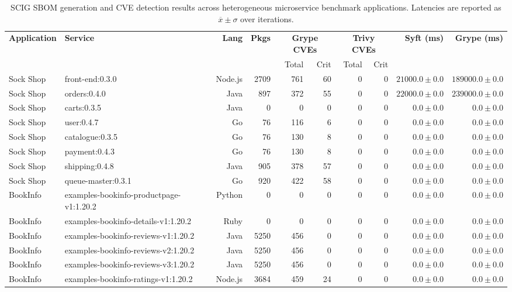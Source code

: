 \begin{table}[htbp]
\centering
\caption{SCIG SBOM generation and CVE detection results across heterogeneous microservice benchmark applications. Latencies are reported as $\overline{x} \pm \sigma$ over iterations.}
\label{tab:scig_s1_per_image}
\scriptsize
\begin{tabular}{llrrrrrrrr}
\toprule
\textbf{Application} & \textbf{Service} & \textbf{Lang} & \textbf{Pkgs} & \multicolumn{2}{c}{\textbf{Grype CVEs}} & \multicolumn{2}{c}{\textbf{Trivy CVEs}} & \textbf{Syft (ms)} & \textbf{Grype (ms)} \\
\cmidrule(lr){5-6} \cmidrule(lr){7-8}
 & & & & Total & Crit & Total & Crit & & \\
\midrule
Sock Shop & front-end:0.3.0 & Node.js & 2709 & 761 & 60 & 0 & 0 & $21000.0 \pm 0.0$ & $189000.0 \pm 0.0$ \\
Sock Shop & orders:0.4.0 & Java & 897 & 372 & 55 & 0 & 0 & $22000.0 \pm 0.0$ & $239000.0 \pm 0.0$ \\
Sock Shop & carts:0.3.5 & Java & 0 & 0 & 0 & 0 & 0 & $0.0 \pm 0.0$ & $0.0 \pm 0.0$ \\
Sock Shop & user:0.4.7 & Go & 76 & 116 & 6 & 0 & 0 & $0.0 \pm 0.0$ & $0.0 \pm 0.0$ \\
Sock Shop & catalogue:0.3.5 & Go & 76 & 130 & 8 & 0 & 0 & $0.0 \pm 0.0$ & $0.0 \pm 0.0$ \\
Sock Shop & payment:0.4.3 & Go & 76 & 130 & 8 & 0 & 0 & $0.0 \pm 0.0$ & $0.0 \pm 0.0$ \\
Sock Shop & shipping:0.4.8 & Java & 905 & 378 & 57 & 0 & 0 & $0.0 \pm 0.0$ & $0.0 \pm 0.0$ \\
Sock Shop & queue-master:0.3.1 & Go & 920 & 422 & 58 & 0 & 0 & $0.0 \pm 0.0$ & $0.0 \pm 0.0$ \\
BookInfo & examples-bookinfo-productpage-v1:1.20.2 & Python & 0 & 0 & 0 & 0 & 0 & $0.0 \pm 0.0$ & $0.0 \pm 0.0$ \\
BookInfo & examples-bookinfo-details-v1:1.20.2 & Ruby & 0 & 0 & 0 & 0 & 0 & $0.0 \pm 0.0$ & $0.0 \pm 0.0$ \\
BookInfo & examples-bookinfo-reviews-v1:1.20.2 & Java & 5250 & 456 & 0 & 0 & 0 & $0.0 \pm 0.0$ & $0.0 \pm 0.0$ \\
BookInfo & examples-bookinfo-reviews-v2:1.20.2 & Java & 5250 & 456 & 0 & 0 & 0 & $0.0 \pm 0.0$ & $0.0 \pm 0.0$ \\
BookInfo & examples-bookinfo-reviews-v3:1.20.2 & Java & 5250 & 456 & 0 & 0 & 0 & $0.0 \pm 0.0$ & $0.0 \pm 0.0$ \\
BookInfo & examples-bookinfo-ratings-v1:1.20.2 & Node.js & 3684 & 459 & 24 & 0 & 0 & $0.0 \pm 0.0$ & $0.0 \pm 0.0$ \\

\end{tabular}
\end{table}
